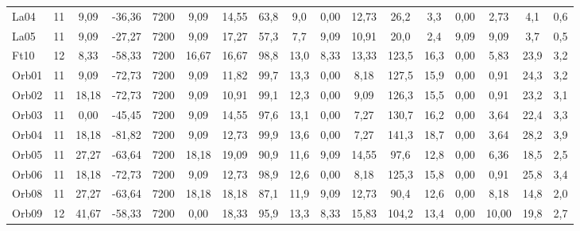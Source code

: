 \begin{landscape}
\begin{table}[H]
\begin{tabular}{ll|ccc|cccc|cccc|cccc}
La04                       & 11                     & 9,09   & -36,36  & 7200    & 9,09   & 14,55  & 63,8  & 9,0   & 0,00   & 12,73  & 26,2   & 3,3   & 0,00          & 2,73          & 4,1         & 0,6         \\
La05                       & 11                     & 9,09   & -27,27  & 7200    & 9,09   & 17,27  & 57,3  & 7,7   & 9,09   & 10,91  & 20,0   & 2,4   & 9,09          & 9,09          & 3,7         & 0,5         \\
Ft10                       & 12                     & 8,33   & -58,33  & 7200    & 16,67  & 16,67  & 98,8  & 13,0  & 8,33   & 13,33  & 123,5  & 16,3  & 0,00          & 5,83          & 23,9        & 3,2         \\
Orb01                      & 11                     & 9,09   & -72,73  & 7200    & 9,09   & 11,82  & 99,7  & 13,3  & 0,00   & 8,18   & 127,5  & 15,9  & 0,00          & 0,91          & 24,3        & 3,2         \\
Orb02                      & 11                     & 18,18  & -72,73  & 7200    & 9,09   & 10,91  & 99,1  & 12,3  & 0,00   & 9,09   & 126,3  & 15,5  & 0,00          & 0,91          & 23,2        & 3,1         \\
Orb03                      & 11                     & 0,00   & -45,45  & 7200    & 9,09   & 14,55  & 97,6  & 13,1  & 0,00   & 7,27   & 130,7  & 16,2  & 0,00          & 3,64          & 22,4        & 3,3         \\
Orb04                      & 11                     & 18,18  & -81,82  & 7200    & 9,09   & 12,73  & 99,9  & 13,6  & 0,00   & 7,27   & 141,3  & 18,7  & 0,00          & 3,64          & 28,2        & 3,9         \\
Orb05                      & 11                     & 27,27  & -63,64  & 7200    & 18,18  & 19,09  & 90,9  & 11,6  & 9,09   & 14,55  & 97,6   & 12,8  & 0,00          & 6,36          & 18,5        & 2,5         \\
Orb06                      & 11                     & 18,18  & -72,73  & 7200    & 9,09   & 12,73  & 98,9  & 12,6  & 0,00   & 8,18   & 125,3  & 15,8  & 0,00          & 0,91          & 25,8        & 3,4         \\
Orb08                      & 11                     & 27,27  & -63,64  & 7200    & 18,18  & 18,18  & 87,1  & 11,9  & 9,09   & 12,73  & 90,4   & 12,6  & 0,00          & 8,18          & 14,8        & 2,0         \\
Orb09                      & 12                     & 41,67  & -58,33  & 7200    & 0,00   & 18,33  & 95,9  & 13,3  & 8,33   & 15,83  & 104,2  & 13,4  & 0,00          & 10,00         & 19,8        & 2,7         \\

\end{tabular}
\end{table}
\end{landscape}
